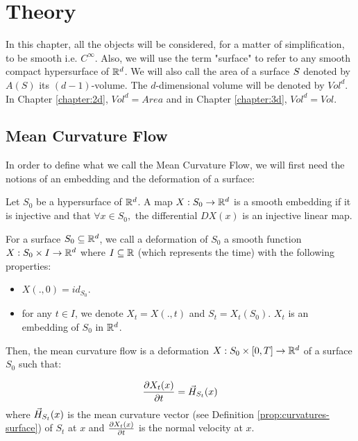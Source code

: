 \chapter{Theory}
\label{chapter:theory}

In this chapter, all the objects will be considered, for a matter of
simplification, to be smooth i.e. $ C^\infty $. Also, we will use the term
"surface" to refer to any smooth compact hypersurface of $ \mathbb{R}^d $. We will also
call the area of a surface $ S $ denoted by $ A(S) $ its $ (d-1)
$-volume. The $ d $-dimensional volume will be denoted by $ Vol^d $. In Chapter
\ref{chapter:2d}, $ Vol^d = Area $ and in Chapter \ref{chapter:3d}, $ Vol^d =
Vol $.

\section{Mean Curvature Flow}

In order to define what we call the Mean Curvature Flow, we will
first need the notions of an embedding and the deformation of a surface:

\begin{definition}
    Let $ S_0 $ be a hypersurface of $ \mathbb{R}^d $. A map $ X: S_0 \to \mathbb{R}^d $ is a
    smooth embedding if it is injective and that $ \forall x\in S_0, $ the
    differential $ D X(x) $ is an injective linear map.
\end{definition}

\begin{definition}
    For a surface $ S_0 \subseteq \mathbb{R}^d $, we call a deformation of $ S_0 $ a
    smooth function $ X : S_0 \times I \to \mathbb{R}^d $ where $ I \subseteq \mathbb{R} $
    (which represents the time) with the following properties:
    \begin{itemize}
        \item $ X(., 0) = id_{S_0} $.
        \item for any $ t \in I $, we denote $ X_t = X(., t) $ and $ S_t =
            X_t(S_0) $. $ X_t $ is an embedding of $ S_0 $ in $ \mathbb{R}^d $.
    \end{itemize}
\end{definition}

Then, the mean curvature flow is a deformation $ X : S_0 \times [0, T] \to \mathbb{R}^d
$ of a surface $ S_0 $ such that:

\begin{equation}
    \frac{\partial{X_t(x)}}{\partial{t}} = \vec{H}_{S_t}(x)
    \label{eqn:mean-curvature-flow}
\end{equation}
where $ \vec{H}_{S_t}(x) $ is the mean curvature vector (see Definition
\ref{prop:curvatures-surface}) of $ S_t $ at $ x $ and $ \frac{\partial{X_t(x)}}{\partial{t}} $
is the normal velocity at $ x $.

